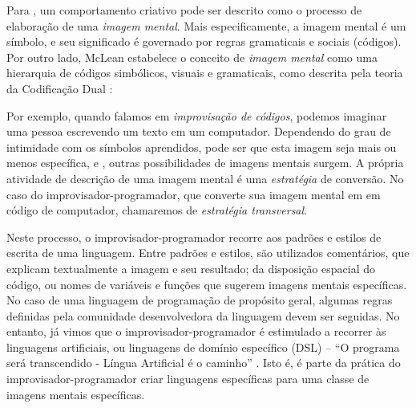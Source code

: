 {Para , um comportamento criativo pode ser descrito como o processo de elaboração de uma \emph{imagem mental}. Mais especificamente, a imagem mental é um símbolo, e seu significado é governado por regras gramaticais e sociais (códigos). Por outro lado, McLean estabelece o conceito de \emph{imagem mental} como uma hierarquia de códigos simbólicos, visuais e gramaticais, como descrita pela teoria da Codificação Dual :


\begin{citacao}
\end{citacao}

Por exemplo, quando falamos em \emph{improvisação de códigos}, podemos imaginar uma pessoa escrevendo um texto em um computador. Dependendo do grau de intimidade com os símbolos aprendidos, pode ser que esta imagem seja mais ou menos específica, e , outras possibilidades de imagens mentais surgem. A própria atividade de descrição de uma imagem mental é uma \emph{estratégia} de conversão. No caso do improvisador-programador, que converte sua imagem mental em em código de computador, chamaremos de \emph{estratégia transversal}.

Neste processo, o improvisador-programador recorre aos padrões e estilos de escrita de uma linguagem. Entre padrões e estilos, são utilizados comentários, que explicam textualmente a imagem e seu resultado; da disposição espacial do código, ou  nomes de variáveis e funções que sugerem imagens mentais específicas. No caso de uma linguagem de programação de propósito geral, algumas regras definidas pela comunidade desenvolvedora da linguagem devem ser seguidas. No entanto, já vimos que o improvisador-programador é estimulado a recorrer às linguagens artificiais, ou linguagens de domínio específico (DSL) -- ``O programa será transcendido - Língua Artificial é o caminho'' . Isto é, é parte da prática do improvisador-programador criar linguagens específicas para uma classe de imagens mentais específicas. 

}
